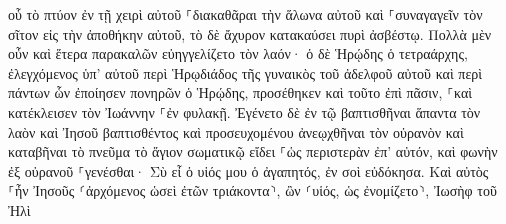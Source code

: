\documentclass{openreader}
\begin{document}
οὗ τὸ πτύον ἐν τῇ χειρὶ αὐτοῦ ⸀διακαθᾶραι τὴν ἅλωνα αὐτοῦ καὶ ⸀συναγαγεῖν τὸν σῖτον εἰς τὴν ἀποθήκην αὐτοῦ, τὸ δὲ ἄχυρον κατακαύσει πυρὶ ἀσβέστῳ. 
Πολλὰ μὲν οὖν καὶ ἕτερα παρακαλῶν εὐηγγελίζετο τὸν λαόν· 
ὁ δὲ Ἡρῴδης ὁ τετραάρχης, ἐλεγχόμενος ὑπ’ αὐτοῦ περὶ Ἡρῳδιάδος τῆς γυναικὸς τοῦ ἀδελφοῦ αὐτοῦ καὶ περὶ πάντων ὧν ἐποίησεν πονηρῶν ὁ Ἡρῴδης, 
προσέθηκεν καὶ τοῦτο ἐπὶ πᾶσιν, ⸀καὶ κατέκλεισεν τὸν Ἰωάννην ⸀ἐν φυλακῇ. 
Ἐγένετο δὲ ἐν τῷ βαπτισθῆναι ἅπαντα τὸν λαὸν καὶ Ἰησοῦ βαπτισθέντος καὶ προσευχομένου ἀνεῳχθῆναι τὸν οὐρανὸν 
καὶ καταβῆναι τὸ πνεῦμα τὸ ἅγιον σωματικῷ εἴδει ⸀ὡς περιστερὰν ἐπ’ αὐτόν, καὶ φωνὴν ἐξ οὐρανοῦ ⸀γενέσθαι· Σὺ εἶ ὁ υἱός μου ὁ ἀγαπητός, ἐν σοὶ εὐδόκησα. 
Καὶ αὐτὸς ⸀ἦν Ἰησοῦς ⸂ἀρχόμενος ὡσεὶ ἐτῶν τριάκοντα⸃, ὢν ⸂υἱός, ὡς ἐνομίζετο⸃, Ἰωσὴφ τοῦ Ἠλὶ 
\end{document}
